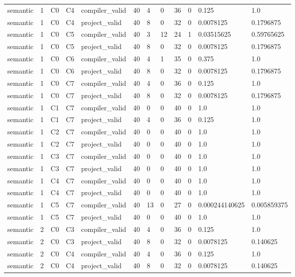 \begin{tabular}{llllllllllll}
semantic & 1 & C0 & C4 & compiler\_valid & 40 & 4 & 0 & 36 & 0 & 0.125 & 1.0 \\
semantic & 1 & C0 & C4 & project\_valid & 40 & 8 & 0 & 32 & 0 & 0.0078125 & 0.1796875 \\
semantic & 1 & C0 & C5 & compiler\_valid & 40 & 3 & 12 & 24 & 1 & 0.03515625 & 0.59765625 \\
semantic & 1 & C0 & C5 & project\_valid & 40 & 8 & 0 & 32 & 0 & 0.0078125 & 0.1796875 \\
semantic & 1 & C0 & C6 & compiler\_valid & 40 & 4 & 1 & 35 & 0 & 0.375 & 1.0 \\
semantic & 1 & C0 & C6 & project\_valid & 40 & 8 & 0 & 32 & 0 & 0.0078125 & 0.1796875 \\
semantic & 1 & C0 & C7 & compiler\_valid & 40 & 4 & 0 & 36 & 0 & 0.125 & 1.0 \\
semantic & 1 & C0 & C7 & project\_valid & 40 & 8 & 0 & 32 & 0 & 0.0078125 & 0.1796875 \\
semantic & 1 & C1 & C7 & compiler\_valid & 40 & 0 & 0 & 40 & 0 & 1.0 & 1.0 \\
semantic & 1 & C1 & C7 & project\_valid & 40 & 4 & 0 & 36 & 0 & 0.125 & 1.0 \\
semantic & 1 & C2 & C7 & compiler\_valid & 40 & 0 & 0 & 40 & 0 & 1.0 & 1.0 \\
semantic & 1 & C2 & C7 & project\_valid & 40 & 0 & 0 & 40 & 0 & 1.0 & 1.0 \\
semantic & 1 & C3 & C7 & compiler\_valid & 40 & 0 & 0 & 40 & 0 & 1.0 & 1.0 \\
semantic & 1 & C3 & C7 & project\_valid & 40 & 0 & 0 & 40 & 0 & 1.0 & 1.0 \\
semantic & 1 & C4 & C7 & compiler\_valid & 40 & 0 & 0 & 40 & 0 & 1.0 & 1.0 \\
semantic & 1 & C4 & C7 & project\_valid & 40 & 0 & 0 & 40 & 0 & 1.0 & 1.0 \\
semantic & 1 & C5 & C7 & compiler\_valid & 40 & 13 & 0 & 27 & 0 & 0.000244140625 & 0.005859375 \\
semantic & 1 & C5 & C7 & project\_valid & 40 & 0 & 0 & 40 & 0 & 1.0 & 1.0 \\
semantic & 2 & C0 & C3 & compiler\_valid & 40 & 4 & 0 & 36 & 0 & 0.125 & 1.0 \\
semantic & 2 & C0 & C3 & project\_valid & 40 & 8 & 0 & 32 & 0 & 0.0078125 & 0.140625 \\
semantic & 2 & C0 & C4 & compiler\_valid & 40 & 4 & 0 & 36 & 0 & 0.125 & 1.0 \\
semantic & 2 & C0 & C4 & project\_valid & 40 & 8 & 0 & 32 & 0 & 0.0078125 & 0.140625 \\

\end{tabular}

